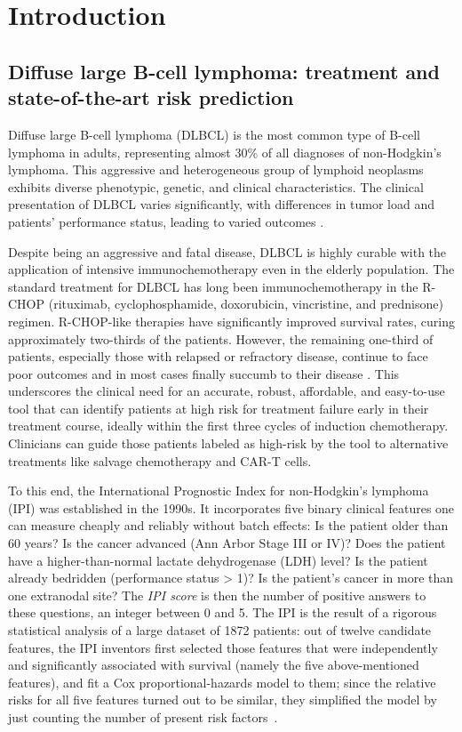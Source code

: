 \chapter{Introduction} \label{chap:intro}

\section{Diffuse large B-cell lymphoma: treatment and state-of-the-art risk prediction}

Diffuse large B-cell lymphoma (DLBCL) is the most common type of B-cell lymphoma in adults, 
representing almost 30\% of all diagnoses of non-Hodgkin's lymphoma. 
This aggressive and heterogeneous group of 
lymphoid neoplasms exhibits
diverse phenotypic, genetic, and clinical characteristics. The clinical presentation of 
DLBCL varies significantly, with differences in tumor load and patients' performance status, leading 
to varied outcomes \cite{dlbcl-review21}.

Despite being an aggressive and fatal disease, DLBCL is highly curable with the 
application of intensive immunochemotherapy even in the elderly population. The standard treatment 
for DLBCL has long been immunochemotherapy in the R-CHOP (rituximab, cyclophosphamide, doxorubicin, 
vincristine, and prednisone) regimen. R-CHOP-like therapies
have significantly improved survival rates, curing approximately two-thirds of the patients. 
However, the remaining one-third of patients, especially 
those with relapsed or refractory disease, continue to face poor outcomes and in most cases finally 
succumb to their disease \citep{glass17}. This underscores the clinical 
need for an accurate, robust, affordable, and easy-to-use tool that can identify patients at high risk 
for treatment failure early in their treatment course, ideally within the first three cycles of 
induction chemotherapy. Clinicians can guide those patients labeled as high-risk by the tool to 
alternative treatments like salvage chemotherapy and CAR-T cells. 

To this end, the International Prognostic Index for non-Hodgkin's lymphoma (IPI) was established in 
the 1990s. It incorporates five binary clinical features one can measure cheaply and 
reliably without batch effects: Is the patient older than \num{60} years? Is the cancer advanced 
(Ann Arbor Stage III or IV)? Does the patient have a higher-than-normal lactate dehydrogenase (LDH) 
level? Is the patient already 
bedridden (performance status > 1)? Is the patient's cancer in more than one extranodal site? The 
\textit{IPI score} is then the number of positive answers to these questions, an integer between 0 
and 5. The IPI is the result of a rigorous statistical analysis 
of a large dataset of \num{1872} patients: out of twelve candidate features, the IPI inventors
first selected those features that were independently and significantly associated with survival 
(namely the five above-mentioned features), and fit a Cox proportional-hazards model to them;
since the relative risks for all five features turned out to be similar, they simplified the model 
by just counting the number of present risk factors~\cite{ipi93}. 

